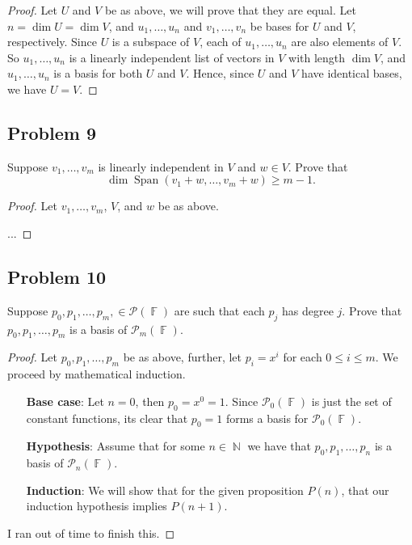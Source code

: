 \documentclass[letterpaper, 12pt]{amsart}
\DeclareMathOperator{\N}{\mathbb{N}}
\DeclareMathOperator{\F}{\mathbb{F}}
\theoremstyle{definition}  %
\DeclareMathOperator{\Span}{Span}
\begin{document}
		\begin{proof}
		Let $U$ and $V$ be as above, we will prove that they are equal.
		Let $n = \dim U = \dim V$, and $u_{1}, \dots, u_{n}$ and $v_{1}, \dots, v_{n}$ be bases for $U$ and $V$, respectively.
		Since $U$ is a subspace of $V$, each of $u_{1}, \dots, u_{n}$ are also elements of $V$.
		So $u_{1}, \dots, u_{n}$ is a linearly independent list of vectors in $V$ with length $\dim V$, and $u_{1}, \dots, u_{n}$ is a basis for both $U$ and $V$.
		Hence, since $U$ and $V$ have identical bases, we have $U = V$.
		\end{proof}

		\subsection*{Problem 9}
		Suppose $v_{1}, \dots, v_{m}$ is linearly independent in $V$ and $w \in V$. 
		Prove that $$\dim \Span(v_{1} + w, \dots, v_{m} + w) \geq m-1.$$

		\begin{proof}
		Let $v_{1}, \dots, v_{m}$, $V$, and $w$ be as above.

		...
		\end{proof}

		\subsection*{Problem 10}
		Suppose $p_{0}, p_{1}, \dots, p_{m}, \in \mathcal{P}(\F)$ are such that each $p_{j}$ has degree $j$. 
		Prove that $p_{0}, p_{1}, \dots, p_{m}$ is a basis of $\mathcal{P}_{m}(\F)$.

		\begin{proof}
		Let $p_{0}, p_{1}, \dots, p_{m}$ be as above, further, let $p_{i} = x^{i}$ for each $0 \leq i \leq m$.
		We proceed by mathematical induction.
			\begin{enumerate}
				\item[\textbf{Base case}:] Let $n = 0$, then $p_{0} = x^{0} = 1$.
				Since $\mathcal{P}_{0}(\F)$ is just the set of constant functions, its clear that $p_{0} = 1$ forms a basis for $\mathcal{P}_{0}(\F)$.

				\item[\textbf{Hypothesis}:] Assume that for some $n \in \N$ we have that $p_{0}, p_{1}, \dots, p_{n}$ is a basis of $\mathcal{P}_{n}(\F)$.

				\item[\textbf{Induction}:] We will show that for the given proposition $P(n)$, that our induction hypothesis implies $P(n+1)$.
			\end{enumerate}

		I ran out of time to finish this.
		\end{proof}
\end{document}
